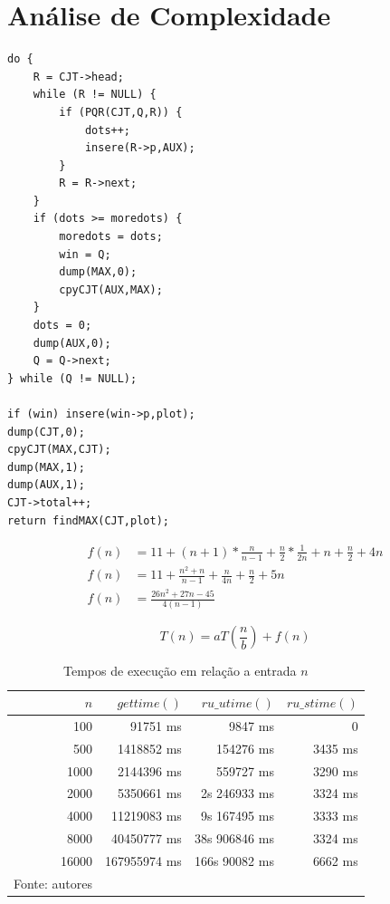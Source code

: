 \documentclass[12pt,a4paper]{article}
\begin{document}
\section{Análise de Complexidade}

\begin{BVerbatim}
do {
	R = CJT->head;
	while (R != NULL) {
		if (PQR(CJT,Q,R)) {
			dots++;
			insere(R->p,AUX);
		}
		R = R->next;
	}
	if (dots >= moredots) {
		moredots = dots;
		win = Q;
		dump(MAX,0);
		cpyCJT(AUX,MAX);
	}
	dots = 0;
	dump(AUX,0);
	Q = Q->next;
} while (Q != NULL);
	
if (win) insere(win->p,plot);
dump(CJT,0);
cpyCJT(MAX,CJT);
dump(MAX,1);
dump(AUX,1);
CJT->total++;
return findMAX(CJT,plot);
\end{BVerbatim}

\[ \begin{split}
f(n) &= 11 + (n+1)*\frac{n}{n-1}+\frac{n}{2}*\frac{1}{2n}+n+\frac{n}{2}+4n \\
f(n) &= 11 + \frac{n^2+n}{n-1}+\frac{n}{4n}+\frac{n}{2}+5n \\
f(n) &= \frac{26n^2+27n-45}{4(n-1)}
\end{split} \]

\[T(n)=aT(\frac{n}{b})+f(n)\]

\pagebreak

\begin{table}[!h]
	\centering
	\caption{Tempos de execução em relação a entrada $n$}
	\label{tab:tempos}
	\begin{tabular}{rrrr}
		\toprule 
		$n$ & $gettime()$ & $ru\_utime()$ & $ru\_stime()$ \\ 
		\midrule
		100 & 91751 ms & 9847 ms & 0 \\
		500 & 1418852 ms & 154276 ms & 3435 ms \\
		1000 & 2144396 ms & 559727 ms & 3290 ms \\
		2000 & 5350661 ms & 2s 246933 ms & 3324 ms \\
		4000 & 11219083 ms & 9s 167495 ms & 3333 ms \\
		8000 & 40450777 ms & 38s 906846 ms & 3324 ms \\
		16000 & 167955974 ms & 166s 90082 ms & 6662 ms \\
		\bottomrule
		\footnotesize Fonte: autores
	\end{tabular}
\end{table}
\end{document}
